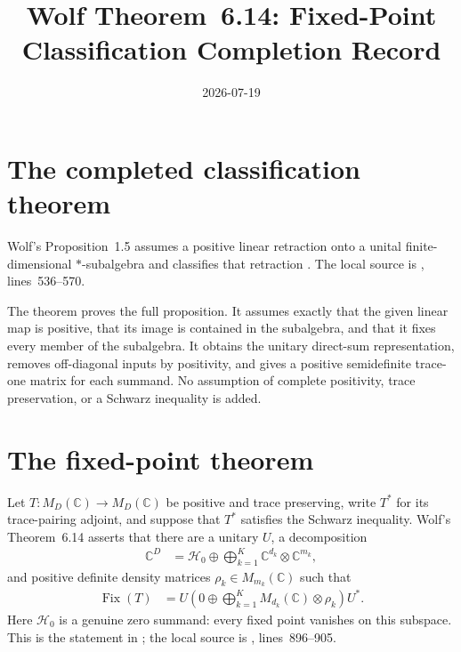 \documentclass{article}
\title{Wolf Theorem~6.14: Fixed-Point Classification Completion Record}
\author{}
\date{2026-07-19}
\begin{document}
\maketitle
{}

\section{The completed classification theorem}

Wolf's Proposition~1.5 assumes a positive linear retraction onto a unital
finite-dimensional $*$-subalgebra and classifies that retraction
\cite[Proposition~1.5 and Equation~(1.40)]{Wolf2012Quantum}.  The local source
is ,
lines~536--570.

The theorem
 proves
the full proposition.  It assumes exactly that the given linear map is
positive, that its image is contained in the subalgebra, and that it fixes
every member of the subalgebra.  It obtains the unitary direct-sum
representation, removes off-diagonal inputs by positivity, and gives a
positive semidefinite trace-one matrix for each summand.  No assumption of
complete positivity, trace preservation, or a Schwarz inequality is added.

\section{The fixed-point theorem}

Let $T:M_D(\mathbb C)\to M_D(\mathbb C)$ be positive and trace preserving,
write $T^*$ for its trace-pairing adjoint, and suppose that $T^*$ satisfies the
Schwarz inequality.
Wolf's Theorem~6.14 asserts that there are a unitary $U$, a decomposition
\begin{align}
    \mathbb C^D
      &= \mathcal H_0\oplus
        \bigoplus_{k=1}^K\mathbb C^{d_k}\otimes\mathbb C^{m_k},
\end{align}
and positive definite density matrices $\rho_k\in M_{m_k}(\mathbb C)$ such
that
\begin{align}
    \operatorname{Fix}(T)
      &= U\left(0\oplus\bigoplus_{k=1}^K
          M_{d_k}(\mathbb C)\otimes\rho_k\right)U^*.
    \tag{Wolf, Theorem 6.14 and Equation (6.63)}
\end{align}
Here $\mathcal H_0$ is a genuine zero summand: every fixed point vanishes on
this subspace.  This is the statement in
\cite[Theorem~6.14]{Wolf2012Quantum}; the local source is
, lines~896--905.
\end{document}
